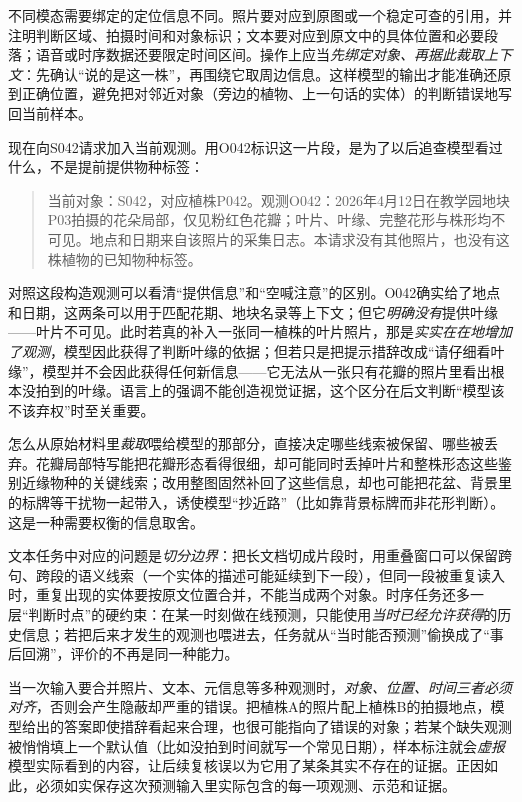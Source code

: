 不同模态需要绑定的定位信息不同。照片要对应到原图或一个稳定可查的引用，并注明判断区域、拍摄时间和对象标识；文本要对应到原文中的具体位置和必要段落；语音或时序数据还要限定时间区间。操作上应当\emph{先绑定对象、再据此裁取上下文}：先确认“说的是这一株”，再围绕它取周边信息。这样模型的输出才能准确还原到正确位置，避免把对邻近对象（旁边的植物、上一句话的实体）的判断错误地写回当前样本。

现在向S042请求加入当前观测。用O042标识这一片段，是为了以后追查模型看过什么，不是提前提供物种标签：

\begin{quote}
  当前对象：S042，对应植株P042。观测O042：2026年4月12日在教学园地块P03拍摄的花朵局部，仅见粉红色花瓣；叶片、叶缘、完整花形与株形均不可见。地点和日期来自该照片的采集日志。本请求没有其他照片，也没有这株植物的已知物种标签。
\end{quote}

对照这段构造观测可以看清“提供信息”和“空喊注意”的区别。O042确实给了地点和日期，这两条可以用于匹配花期、地块名录等上下文；但它\emph{明确没有}提供叶缘——叶片不可见。此时若真的补入一张同一植株的叶片照片，那是\emph{实实在在地增加了观测}，模型因此获得了判断叶缘的依据；但若只是把提示措辞改成“请仔细看叶缘”，模型并不会因此获得任何新信息——它无法从一张只有花瓣的照片里看出根本没拍到的叶缘。语言上的强调不能创造视觉证据，这个区分在后文判断“模型该不该弃权”时至关重要。

怎么从原始材料里\emph{裁取}喂给模型的那部分，直接决定哪些线索被保留、哪些被丢弃。花瓣局部特写能把花瓣形态看得很细，却可能同时丢掉叶片和整株形态这些鉴别近缘物种的关键线索；改用整图固然补回了这些信息，却也可能把花盆、背景里的标牌等干扰物一起带入，诱使模型“抄近路”（比如靠背景标牌而非花形判断）。这是一种需要权衡的信息取舍。

文本任务中对应的问题是\emph{切分边界}：把长文档切成片段时，用重叠窗口可以保留跨句、跨段的语义线索（一个实体的描述可能延续到下一段），但同一段被重复读入时，重复出现的实体要按原文位置合并，不能当成两个对象。时序任务还多一层“判断时点”的硬约束：在某一时刻做在线预测，只能使用\emph{当时已经允许获得}的历史信息；若把后来才发生的观测也喂进去，任务就从“当时能否预测”偷换成了“事后回溯”，评价的不再是同一种能力。

当一次输入要合并照片、文本、元信息等多种观测时，\emph{对象、位置、时间三者必须对齐}，否则会产生隐蔽却严重的错误。把植株A的照片配上植株B的拍摄地点，模型给出的答案即使措辞看起来合理，也很可能指向了错误的对象；若某个缺失观测被悄悄填上一个默认值（比如没拍到时间就写一个常见日期），样本标注就会\emph{虚报}模型实际看到的内容，让后续复核误以为它用了某条其实不存在的证据。正因如此，必须如实保存这次预测输入里实际包含的每一项观测、示范和证据。

